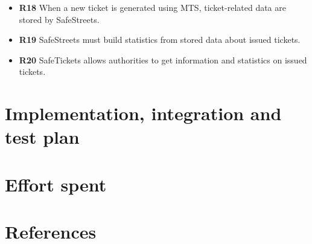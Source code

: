 \documentclass[a4paper]{article}
\begin{document}
\begin{itemize}
\item
  \textbf{R18} When a new ticket is generated using MTS, ticket-related
  data are stored by SafeStreets.
\item
  \textbf{R19} SafeStreets must build statistics from stored data about
  issued tickets.
\item
  \textbf{R20} SafeTickets allows authorities to get information and
  statistics on issued tickets.
\end{itemize}


\newpage
\section{Implementation, integration and test plan}
\newpage
\section{Effort spent}
\section{References}
\end{document}
